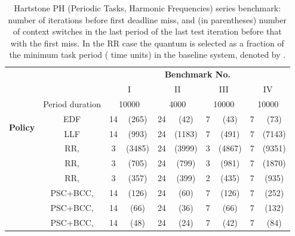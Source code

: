 \documentclass[a4paper]{article}
\begin{document}
\begin{table*}[ht]
 \begin{footnotesize}
 \begin{center}
  \begin{tabular}{|cc|cc|cc|cc|cc|}
    \hline
    & & \multicolumn{8}{c}{\textbf{Benchmark No.}} \vline \\
    & & \multicolumn{2}{c}{I}      & \multicolumn{2}{c}{II}   &
        \multicolumn{2}{c}{III}    & \multicolumn{2}{c}{IV} \vline  \\ \hline \hline
    & Period duration & \multicolumn{2}{c}{10000} \vline & \multicolumn{2}{c}{4000} \vline 
                      & \multicolumn{2}{c}{10000} \vline & \multicolumn{2}{c}{10000} \vline \\ \hline \hline
    \multirow{8}{*}{\begin{sideways}\textbf{Policy}\end{sideways}} 
    & EDF                             & 14 & (265)  & 24 & (42)   &  7 & (43)   &  7  & (73)   \\
    & LLF                             & 14 & (993)  & 24 & (1183) &  7 & (491)  &  7  & (7143) \\
    & RR,    &  3 & (3485) & 24 & (3999) &  3 & (4867) &  7  & (9351) \\
    & RR,    &  3 & (705)  & 24 & (799)  &  3 & (981)  &  7  & (1870) \\
    & RR,   &  3 & (357)  & 24 & (399)  &  2 & (435)  &  7  & (935)  \\
    & PSC+BCC,    & 14 & (126)  & 24 & (60)   &  7 & (126)  &  7  & (252)  \\
    & PSC+BCC,   & 14 & (66)   & 24 & (36)   &  7 & (66)   &  7  & (132)  \\
    & PSC+BCC,   & 14 & (48)   & 24 & (24)   &  7 & (42)   &  7  & (84)   \\
    \hline
  \end{tabular}
 \end{center}
 \end{footnotesize}
 \caption{Hartstone PH (Periodic Tasks, Harmonic Frequencies) series benchmark: number of iterations before first deadline miss, and (in parentheses) number of context switches in the last period of the last test iteration before that with the first miss. In the RR case the quantum  is selected as a fraction of the minimum task period ( time units) in the baseline system, denoted by .}
 \label{tab:BenchPH-IterationsBefore1stMiss}
\end{table*}
\end{document}
